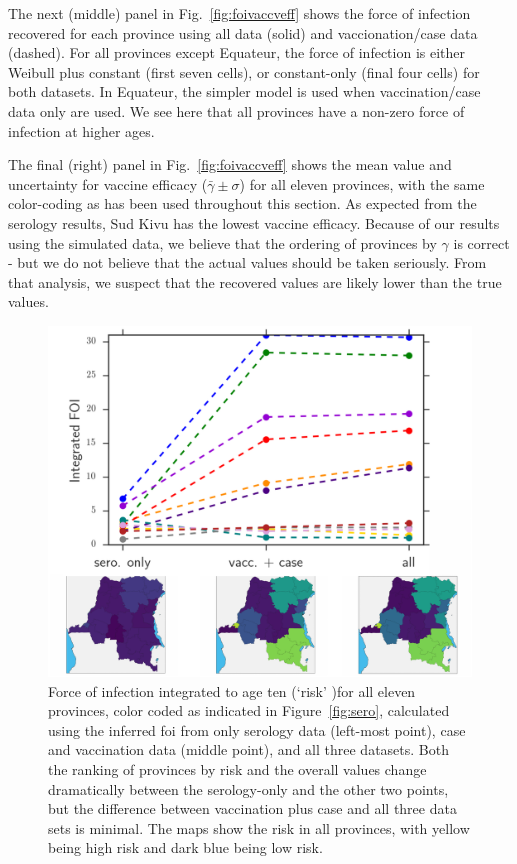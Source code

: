 \documentclass[nofootinbib,aps,pre,twocolumn,superscriptaddress,showkeys,showpacs]{revtex4-1}
\begin{document}
The next (middle) panel in Fig.~\ref{fig:foivaccveff} shows the force of infection recovered for each province using all data (solid) and vaccionation/case data (dashed). For all provinces except Equateur, the force of infection is either Weibull plus constant (first seven cells), or constant-only (final four cells) for both datasets. In Equateur, the simpler model is used when vaccination/case data only are used. We see here that all provinces have a non-zero force of infection at higher ages.

The final (right) panel in Fig.~\ref{fig:foivaccveff} shows the mean value and uncertainty for vaccine efficacy ($\bar{\gamma} \pm \sigma$) for all eleven provinces, with the same color-coding as has been used throughout this section. As expected from the serology results, Sud Kivu has the lowest vaccine efficacy. Because of our results using the simulated data, we believe that the ordering of provinces by $\gamma$ is correct - but we do not believe that the actual values should be taken seriously. From that analysis, we suspect that the recovered values are likely lower than the true values.

\begin{figure}
\includegraphics[width=\columnwidth,angle=0]{figures/RiskRank-crop.pdf}
\caption{\label{fig:riskrank} Force of infection integrated to age ten (`risk' )for all eleven provinces, color coded as indicated in Figure~\ref{fig:sero}, calculated using the inferred foi from only serology data (left-most point), case and vaccination data (middle point), and all three datasets. Both the ranking of provinces by risk and the overall values change dramatically between the serology-only and the other two points, but the difference between vaccination plus case and all three data sets is minimal. The maps show the risk in all provinces, with yellow being high risk and dark blue being low risk. }
\end{figure}
\end{document}

